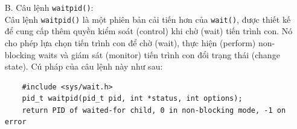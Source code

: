 \documentclass{article}
\begin{document}
\begin{enumerate}
\begin{verbatim}
            exit(0);                                                                                                                                                                                               
        }                                                                                                                                                                                                          
        else{                                                                                                                                                                                                      
            printf("Hello from parent\n");                                                                                                                                                                         
            pid_t pid = wait(&status);                                                                                                                                                                             
            printf("Child process terminated has ID: %d",pid);                                                                                                                                                     
        }                                                                                                                                                                                                          
        return 0;                                                                                                                                                                                                  
    }
\end{verbatim}
Lúc này chương trình sẽ in ra \verb|PID| của tiến trình con sau \verb|30s| chờ (sleep) là \verb|55370|, kiểm tra lại bằng câu lệnh \verb|ps -aux|, ta  thấy kết quả hoàn toàn trùng khớp.
    \item[B.] Câu lệnh \verb|waitpid()|: 
\\ Câu lệnh \verb|waitpid()| là một phiên bản cải tiến hơn của \verb|wait()|, được thiết kế để cung cấp thêm quyền kiểm soát (control) khi chờ (wait) tiến trình con. Nó
cho phép lựa chọn tiến trình con để chờ (wait), thực hiện (perform) non-blocking waits và giám sát (monitor) tiến trình con đổi trạng thái (change state). Cú pháp của câu lệnh này như sau:
\begin{verbatim}
    #include <sys/wait.h>
    pid_t waitpid(pid_t pid, int *status, int options);
    return PID of waited-for child, 0 in non-blocking mode, -1 on error

\end{verbatim}
\end{enumerate}
\end{document}
